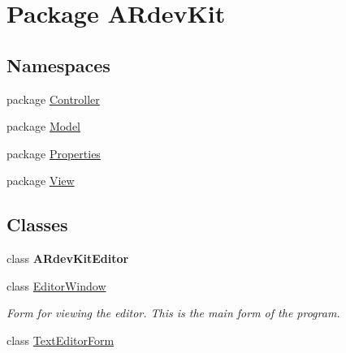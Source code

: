 \hypertarget{namespace_a_rdev_kit}{\section{Package A\-Rdev\-Kit}
\label{namespace_a_rdev_kit}
}
\subsection*{Namespaces}
\begin{DoxyCompactItemize}
\item 
package \hyperlink{namespace_a_rdev_kit_1_1_controller}{Controller}
\item 
package \hyperlink{namespace_a_rdev_kit_1_1_model}{Model}
\item 
package \hyperlink{namespace_a_rdev_kit_1_1_properties}{Properties}
\item 
package \hyperlink{namespace_a_rdev_kit_1_1_view}{View}
\end{DoxyCompactItemize}
\subsection*{Classes}
\begin{DoxyCompactItemize}
\item 
class {\bfseries A\-Rdev\-Kit\-Editor}
\item 
class \hyperlink{class_a_rdev_kit_1_1_editor_window}{Editor\-Window}
\begin{DoxyCompactList}\small\item\em Form for viewing the editor. This is the main form of the program. \end{DoxyCompactList}\item 
class \hyperlink{class_a_rdev_kit_1_1_text_editor_form}{Text\-Editor\-Form}
\end{DoxyCompactItemize}
